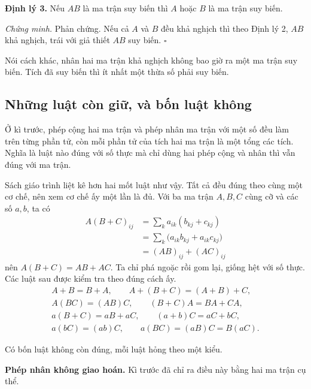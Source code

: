\documentclass[12pt,a4paper]{article}
\begin{document}
\textbf{Định lý 3.} Nếu \(AB\) là ma trận suy biến thì \(A\) hoặc \(B\) là ma trận suy biến.

\emph{Chứng minh.} Phản chứng. Nếu cả \(A\) và \(B\) đều khả nghịch thì theo Định lý 2, \(AB\) khả nghịch, trái với giả thiết \(AB\) suy biến. \(\square\)

Nói cách khác, nhân hai ma trận khả nghịch không bao giờ ra một ma trận suy biến. Tích đã suy biến thì ít nhất một thừa số phải suy biến.

\subsection{Những luật còn giữ, và bốn luật không}

Ở kì trước, phép cộng hai ma trận và phép nhân ma trận với một số đều làm trên từng phần tử, còn mỗi phần tử của tích hai ma trận là một tổng các tích. Nghĩa là luật nào đúng với số thực mà chỉ dùng hai phép cộng và nhân thì vẫn đúng với ma trận.

Sách giáo trình liệt kê hơn hai mốt luật như vậy. Tất cả đều đúng theo cùng một cơ chế, nên xem cơ chế ấy một lần là đủ. Với ba ma trận \(A,B,C\) cùng cỡ và các số \(a,b\), ta có
$$
\begin{aligned}
A(B+C)_{ij} &= \sum_{k}a_{ik}(b_{kj}+c_{kj})\\
            &= \sum_{k}\bigl(a_{ik}b_{kj}+a_{ik}c_{kj}\bigr)\\
            &= (AB)_{ij}+(AC)_{ij}
\end{aligned}
$$
nên \(A(B+C)=AB+AC\). Ta chỉ phá ngoặc rồi gom lại, giống hệt với số thực. Các luật sau được kiểm tra theo đúng cách ấy.
$$
\begin{gathered}
A+B=B+A,\qquad A+(B+C)=(A+B)+C,\\
A(BC)=(AB)C,\qquad (B+C)A=BA+CA,\\
a(B+C)=aB+aC,\qquad (a+b)C=aC+bC,\\
a(bC)=(ab)C,\qquad a(BC)=(aB)C=B(aC).
\end{gathered}
$$

Có bốn luật không còn đúng, mỗi luật hỏng theo một kiểu.

\textbf{Phép nhân không giao hoán.} Kì trước đã chỉ ra điều này bằng hai ma trận cụ thể.
\end{document}
